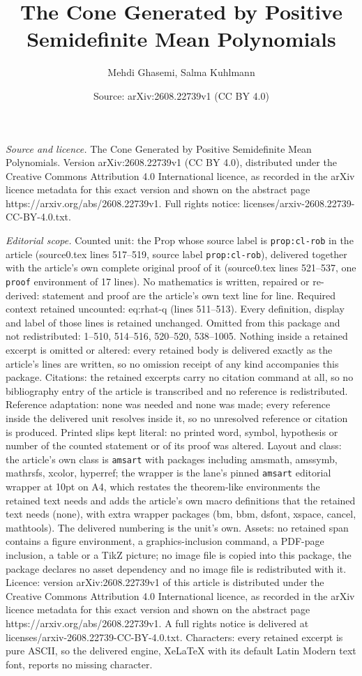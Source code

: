 \documentclass[10pt,a4paper]{amsart}
\title[The Cone Generated by Positive Semidefinite Mean Polynomials]{The Cone Generated by Positive Semidefinite Mean Polynomials}
\author{Mehdi Ghasemi, Salma Kuhlmann}
\date{Source: arXiv:2608.22739v1 (CC BY 4.0)}
\begin{document}
\maketitle

\noindent\emph{Source and licence.} The Cone Generated by Positive Semidefinite Mean Polynomials. Version arXiv:2608.22739v1 (CC BY 4.0), distributed under the Creative Commons Attribution 4.0 International licence, as recorded in the arXiv licence metadata for this exact version and shown on the abstract page https://arxiv.org/abs/2608.22739v1. Full rights notice: licenses/arxiv-2608.22739-CC-BY-4.0.txt.\par\smallskip

\noindent\textit{Editorial scope.} Counted unit: the Prop whose source label is \texttt{prop:cl-rob} in the article (source0.tex lines 517--519, source label \texttt{prop:cl-rob}), delivered together with the article's own complete original proof of it (source0.tex lines 521--537, one \texttt{proof} environment of 17 lines). No mathematics is written, repaired or re-derived: statement and proof are the article's own text line for line. Required context retained uncounted: eq:rhat-q (lines 511--513). Every definition, display and label of those lines is retained unchanged. Omitted from this package and not redistributed: 1--510, 514--516, 520--520, 538--1005. Nothing inside a retained excerpt is omitted or altered: every retained body is delivered exactly as the article's lines are written, so no omission receipt of any kind accompanies this package. Citations: the retained excerpts carry no citation command at all, so no bibliography entry of the article is transcribed and no reference is redistributed. Reference adaptation: none was needed and none was made; every reference inside the delivered unit resolves inside it, so no unresolved reference or citation is produced. Printed slips kept literal: no printed word, symbol, hypothesis or number of the counted statement or of its proof was altered. Layout and class: the article's own class is \texttt{amsart} with packages including amsmath, amssymb, mathrsfs, xcolor, hyperref; the wrapper is the lane's pinned \texttt{amsart} editorial wrapper at 10pt on A4, which restates the theorem-like environments the retained text needs and adds the article's own macro definitions that the retained text needs (none), with extra wrapper packages (bm, bbm, dsfont, xspace, cancel, mathtools). The delivered numbering is the unit's own. Assets: no retained span contains a figure environment, a graphics-inclusion command, a PDF-page inclusion, a table or a TikZ picture; no image file is copied into this package, the package declares no asset dependency and no image file is redistributed with it. Licence: version arXiv:2608.22739v1 of this article is distributed under the Creative Commons Attribution 4.0 International licence, as recorded in the arXiv licence metadata for this exact version and shown on the abstract page https://arxiv.org/abs/2608.22739v1. A full rights notice is delivered at licenses/arxiv-2608.22739-CC-BY-4.0.txt. Characters: every retained excerpt is pure ASCII, so the delivered engine, XeLaTeX with its default Latin Modern text font, reports no missing character.
\end{document}
